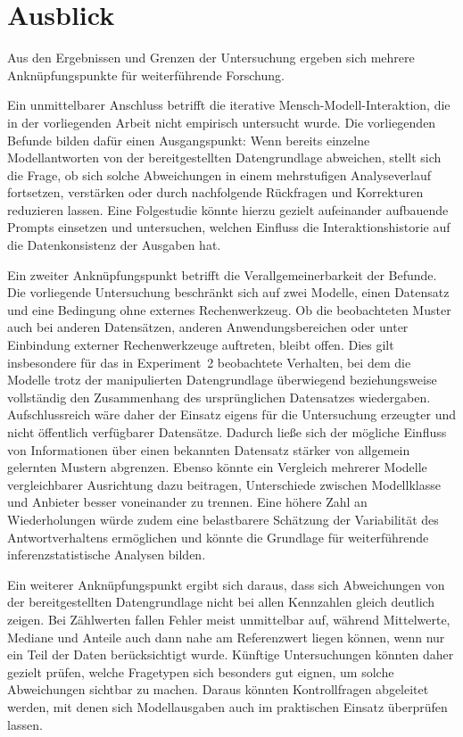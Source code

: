 \section{Ausblick}

Aus den Ergebnissen und Grenzen der Untersuchung ergeben sich mehrere Anknüpfungspunkte für weiterführende Forschung.

Ein unmittelbarer Anschluss betrifft die iterative Mensch-Modell-Interaktion, die in der vorliegenden Arbeit nicht empirisch untersucht wurde. Die vorliegenden Befunde bilden dafür einen Ausgangspunkt: Wenn bereits einzelne Modellantworten von der bereitgestellten Datengrundlage abweichen, stellt sich die Frage, ob sich solche Abweichungen in einem mehrstufigen Analyseverlauf fortsetzen, verstärken oder durch nachfolgende Rückfragen und Korrekturen reduzieren lassen. Eine Folgestudie könnte hierzu gezielt aufeinander aufbauende Prompts einsetzen und untersuchen, welchen Einfluss die Interaktionshistorie auf die Datenkonsistenz der Ausgaben hat.

Ein zweiter Anknüpfungspunkt betrifft die Verallgemeinerbarkeit der Befunde. Die vorliegende Untersuchung beschränkt sich auf zwei Modelle, einen Datensatz und eine Bedingung ohne externes Rechenwerkzeug. Ob die beobachteten Muster auch bei anderen Datensätzen, anderen Anwendungsbereichen oder unter Einbindung externer Rechenwerkzeuge auftreten, bleibt offen. Dies gilt insbesondere für das in Experiment~2 beobachtete Verhalten, bei dem die Modelle trotz der manipulierten Datengrundlage überwiegend beziehungsweise vollständig den Zusammenhang des ursprünglichen Datensatzes wiedergaben. Aufschlussreich wäre daher der Einsatz eigens für die Untersuchung erzeugter und nicht öffentlich verfügbarer Datensätze. Dadurch ließe sich der mögliche Einfluss von Informationen über einen bekannten Datensatz stärker von allgemein gelernten Mustern abgrenzen. Ebenso könnte ein Vergleich mehrerer Modelle vergleichbarer Ausrichtung dazu beitragen, Unterschiede zwischen Modellklasse und Anbieter besser voneinander zu trennen. Eine höhere Zahl an Wiederholungen würde zudem eine belastbarere Schätzung der Variabilität des Antwortverhaltens ermöglichen und könnte die Grundlage für weiterführende inferenzstatistische Analysen bilden.

Ein weiterer Anknüpfungspunkt ergibt sich daraus, dass sich Abweichungen von der bereitgestellten Datengrundlage nicht bei allen Kennzahlen gleich deutlich zeigen. Bei Zählwerten fallen Fehler meist unmittelbar auf, während Mittelwerte, Mediane und Anteile auch dann nahe am Referenzwert liegen können, wenn nur ein Teil der Daten berücksichtigt wurde. Künftige Untersuchungen könnten daher gezielt prüfen, welche Fragetypen sich besonders gut eignen, um solche Abweichungen sichtbar zu machen. Daraus könnten Kontrollfragen abgeleitet werden, mit denen sich Modellausgaben auch im praktischen Einsatz überprüfen lassen.

